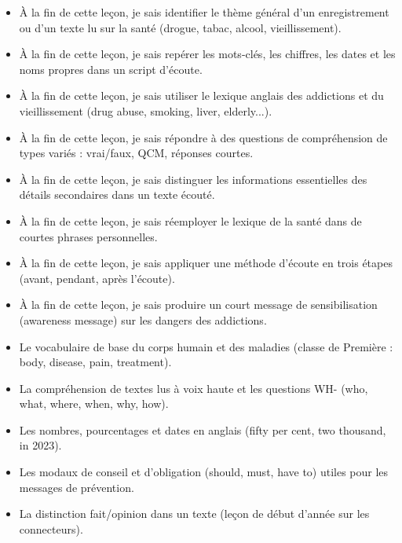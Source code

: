 \documentclass[11pt]{article}
\begin{document}
\begin{objectifs}
\begin{itemize}
\item À la fin de cette leçon, je sais identifier le thème général d'un enregistrement ou d'un texte lu sur la santé (drogue, tabac, alcool, vieillissement).
\item À la fin de cette leçon, je sais repérer les mots-clés, les chiffres, les dates et les noms propres dans un script d'écoute.
\item À la fin de cette leçon, je sais utiliser le lexique anglais des addictions et du vieillissement (drug abuse, smoking, liver, elderly...).
\item À la fin de cette leçon, je sais répondre à des questions de compréhension de types variés : vrai/faux, QCM, réponses courtes.
\item À la fin de cette leçon, je sais distinguer les informations essentielles des détails secondaires dans un texte écouté.
\item À la fin de cette leçon, je sais réemployer le lexique de la santé dans de courtes phrases personnelles.
\item À la fin de cette leçon, je sais appliquer une méthode d'écoute en trois étapes (avant, pendant, après l'écoute).
\item À la fin de cette leçon, je sais produire un court message de sensibilisation (awareness message) sur les dangers des addictions.
\end{itemize}
\end{objectifs}

\begin{prerequis}
\begin{itemize}
\item Le vocabulaire de base du corps humain et des maladies (classe de Première : body, disease, pain, treatment).
\item La compréhension de textes lus à voix haute et les questions WH- (who, what, where, when, why, how).
\item Les nombres, pourcentages et dates en anglais (fifty per cent, two thousand, in 2023).
\item Les modaux de conseil et d'obligation (should, must, have to) utiles pour les messages de prévention.
\item La distinction fait/opinion dans un texte (leçon de début d'année sur les connecteurs).
\end{itemize}
\end{prerequis}
\end{document}
